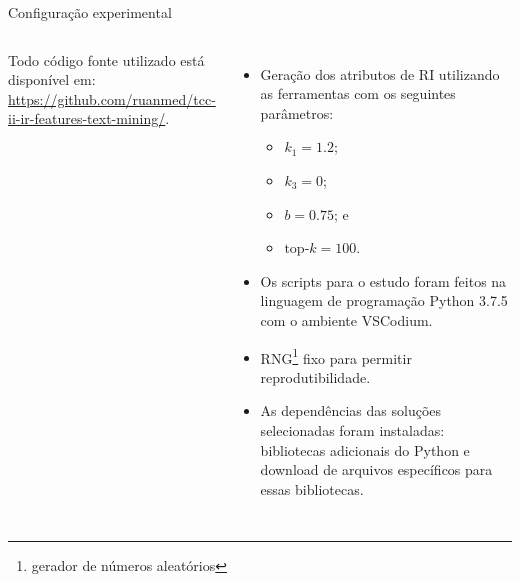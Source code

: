 \documentclass[%
  10pt,%
  aspectratio = 169,%
  compress,%
  t,%
]{beamer}%
\begin{document}
    \begin{frame}{}{Configuração experimental}
        \begin{columns}[T]
                \centering
                

                \raggedright
                Todo código fonte utilizado está disponível em: \hyperlink{https://github.com/ruanmed/tcc-ii-ir-features-text-mining/}{https://github.com/ruanmed/tcc-ii-ir-features-text-mining/}.
                \begin{itemize}
                    \item Geração dos atributos de RI utilizando as ferramentas com os seguintes parâmetros:
                    \begin{itemize}
                        \vspace{-0.5cm}
                        \item $k_1 = 1.2$;
                        \item $k_3 = 0$;
                        \item $b = 0.75$; e
                        \item $\text{top-}k = 100$.
                    \end{itemize}
                    \item Os scripts para o estudo foram feitos na linguagem de programação Python 3.7.5 com o ambiente VSCodium.

                    \item RNG\footnote{gerador de números aleatórios} fixo para permitir reprodutibilidade.

                    \item As dependências das soluções selecionadas foram instaladas: bibliotecas adicionais do Python e download de arquivos específicos para essas bibliotecas.
                \end{itemize}
        \end{columns}
    \end{frame}
\end{document}
